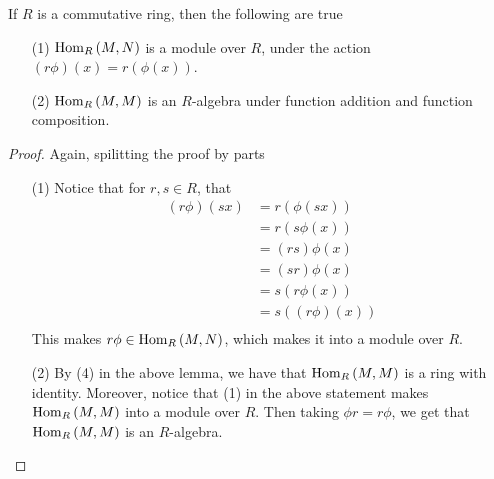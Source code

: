 \begin{corollary}
    If $R$ is a commutative ring, then the following are true
    \begin{enumerate}
        \item[(1)] $\operatorname{Hom}_R{(M,N)}$ is a module over $R$, under the action
            $(r\phi)(x)=r(\phi(x))$.

        \item[(2)] $\operatorname{Hom}_R{(M,M)}$ is an $R$-algebra under function addition and
            function composition.
    \end{enumerate}
\end{corollary}
\begin{proof}
    Again, spilitting the proof by parts
    \begin{enumerate}
        \item[(1)] Notice that for $r,s \in R$, that
            \begin{align*}
                (r\phi)(sx) &=  r(\phi(sx)) \\
                         &= r(s\phi(x)) \\
                         &= (rs)\phi(x) \\
                         &= (sr)\phi(x) \\
                         &= s(r\phi(x)) \\
                         &= s((r\phi)(x))   \\
            \end{align*}
            This makes $r\phi \in \operatorname{Hom}_R{(M,N)}$, which makes it into a module
            over $R$.

        \item[(2)] By (4) in the above lemma, we have that $\operatorname{Hom}_R{(M,M)}$ is a
            ring with identity. Moreover, notice that (1) in the above statement
            makes $\operatorname{Hom}_R{(M,M)}$ into a module over $R$. Then taking
            $\phi{r}=r\phi$, we get that $\operatorname{Hom}_R{(M,M)}$ is an $R$-algebra.
    \end{enumerate}
\end{proof}

